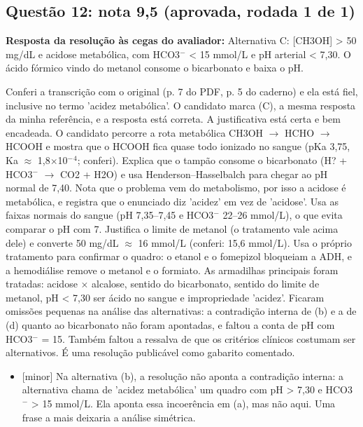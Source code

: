 \documentclass{article}%
\begin{document}
\subsection*{Questão 12: nota 9,5 (aprovada, rodada 1 de 1)}%
\textbf{Resposta da resolução às cegas do avaliador:} Alternativa C: {[}CH3OH{]} > 50 mg/dL e acidose metabólica, com HCO3$^{-}$ < 15 mmol/L e pH arterial < 7,30. O ácido fórmico vindo do metanol consome o bicarbonato e baixa o pH.\par %
Conferi a transcrição com o original (p. 7 do PDF, p. 5 do caderno) e ela está fiel, inclusive no termo 'acidez metabólica'. O candidato marca (C), a mesma resposta da minha referência, e a resposta está correta.\newline%
\newline%
A justificativa está certa e bem encadeada. O candidato percorre a rota metabólica CH3OH $\to$ HCHO $\to$ HCOOH e mostra que o HCOOH fica quase todo ionizado no sangue (pKa 3,75, Ka $\approx$ 1,8$\times$10$^{-}$$^{4}$; conferi). Explica que o tampão consome o bicarbonato (H? + HCO3$^{-}$ $\to$ CO2 + H2O) e usa Henderson--Hasselbalch para chegar ao pH normal de 7,40. Nota que o problema vem do metabolismo, por isso a acidose é metabólica, e registra que o enunciado diz 'acidez' em vez de 'acidose'. Usa as faixas normais do sangue (pH 7,35--7,45 e HCO3$^{-}$ 22--26 mmol/L), o que evita comparar o pH com 7. Justifica o limite de metanol (o tratamento vale acima dele) e converte 50 mg/dL $\approx$ 16 mmol/L (conferi: 15,6 mmol/L). Usa o próprio tratamento para confirmar o quadro: o etanol e o fomepizol bloqueiam a ADH, e a hemodiálise remove o metanol e o formiato.\newline%
\newline%
As armadilhas principais foram tratadas: acidose $\times$ alcalose, sentido do bicarbonato, sentido do limite de metanol, pH < 7,30 ser ácido no sangue e impropriedade 'acidez'. Ficaram omissões pequenas na análise das alternativas: a contradição interna de (b) e a de (d) quanto ao bicarbonato não foram apontadas, e faltou a conta de pH com HCO3$^{-}$ = 15. Também faltou a ressalva de que os critérios clínicos costumam ser alternativos. É uma resolução publicável como gabarito comentado.%
\begin{itemize}%
\item%
{[}minor{]} Na alternativa (b), a resolução não aponta a contradição interna: a alternativa chama de 'acidez metabólica' um quadro com pH > 7,30 e HCO3$^{-}$ > 15 mmol/L. Ela aponta essa incoerência em (a), mas não aqui. Uma frase a mais deixaria a análise simétrica.%

\end{itemize}$$
\end{document}
